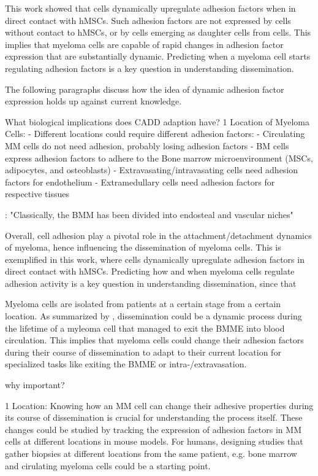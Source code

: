 This work showed that \INA cells dynamically upregulate adhesion factors when in
direct contact with \acp{hMSC}. Such adhesion factors are not expressed by \INA
cells without contact to \acp{hMSC}, or by \INA cells emerging as daughter cells
from \MAina cells. This implies that myeloma cells are capable of rapid changes in
adhesion factor expression that are substantially dynamic.
Predicting when a myeloma cell starts regulating adhesion factors is a key
question in understanding dissemination.

The following paragraphs
discuss how the idea of dynamic adhesion factor expression holds up
against current knowledge.

What biological implications does CADD adaption have?
1 Location of Myeloma Cells:
- Different locations could require different adhesion factors:
- Circulating MM cells do not need adhesion, probably losing adhesion factors
- BM cells express adhesion factors to adhere to the Bone marrow microenvironment (MSCs, adipocytes, and osteoblasts)
- Extravasating/intravasating cells need adhesion factors for endothelium
- Extramedullary cells need adhesion factors for respective tissues


\citet{bouzerdanAdhesionMoleculesMultiple2022}: "Classically, the BMM has been
divided into endosteal and vascular niches"

Overall, cell adhesion play a pivotal role in the attachment/detachment dynamics of
myeloma, hence influencing the dissemination of myeloma cells. This is
exemplified in this work, where \INA cells dynamically upregulate adhesion
factors in direct contact with \acp{hMSC}. Predicting how and when myeloma cells
regulate adhesion activity is a key question in understanding dissemination,
since that

Myeloma cells are isolated from patients at a certain stage from a certain
location. As summarized by \citet{zeissigTumourDisseminationMultiple2020},
dissemination could be a dynamic process during the lifetime of a myleoma cell
that managed to exit the \ac{BMME} into blood circulation. This implies that
myeloma cells could change their adhesion factors during their course of
dissemination to adapt to their current location for specialized tasks like
exiting the \ac{BMME} or intra-/extravasation.

why important?

1 Location: Knowing how an MM cell can change their adhesive properties during its course of
dissemination is crucial for understanding the process itself. These changes
could be studied by tracking the expression of adhesion factors in MM cells at
different locations in mouse models. For humans, designing studies that gather
biopsies at different locations from the same patient, e.g. bone marrow and cirulating
myeloma cells could be a starting point.

